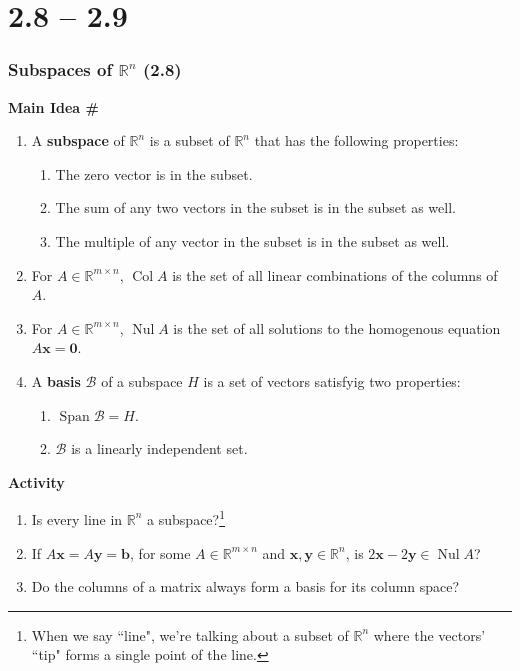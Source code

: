 \documentclass[titlepage, a4paper, 10pt]{article}
\renewcommand{\vec}[1]{\mathbf{#1}}
\DeclareMathOperator{\vspan}{Span}
\DeclareMathOperator{\colspace}{Col}
\DeclareMathOperator{\nullspace}{Nul}
\newcounter{mainideas}
\newcommand{\mainidea}{\textbf{Main Idea \#\themainideas \stepcounter{mainideas}}}
\newenvironment{mideea}[1]
{%
\begin{lrbox}{\mybox}%
	\begin{minipage}{#1\textwidth}
		{\centering \mainidea \par}

}
{\end{minipage}\end{lrbox}\begin{center}\fbox{\usebox{\mybox}}\end{center}}
\newcounter{activity}
\newenvironment{newactivity}
{
	\noindent\textbf{Activity \theactivity}
}
{
\stepcounter{activity}
\par
}
\begin{document}
\part{2.8 -- 2.9}
\section{\centering Subspaces of \(\mathbb{R}^n\) (2.8)}
\begin{mideea}{0.9}
	\begin{enumerate}
		\item A \textbf{subspace} of \(\mathbb{R}^n\) is a subset of \(\mathbb{R}^n\) that has the following properties:
			\begin{enumerate}
				\item The zero vector is in the subset.
				\item The sum of any two vectors in the subset is in the subset as well.
				\item The multiple of any vector in the subset is in the subset as well.
			\end{enumerate}
		\item For \(A \in \mathbb{R}^{m \times n}\), \(\colspace A\) is the set of all linear combinations of the columns of \(A\). 
		\item For \(A \in \mathbb{R}^{m \times n}\), \(\nullspace A\) is the set of all solutions to the homogenous equation \(A \vec{x} = \vec{0}\).
		\item A \textbf{basis} \(\mathcal{B}\) of a subspace \(H\) is a set of vectors satisfyig two properties:
			\begin{enumerate}
				\item \(\vspan \mathcal{B} = H\).
				\item \(\mathcal{B}\) is a linearly independent set.
			\end{enumerate}
	\end{enumerate}
\end{mideea}

\begin{newactivity}
	\begin{enumerate}
		\item Is every line in \(\mathbb{R}^n\) a subspace?\footnote{When we say ``line", we're talking about a subset of \(\mathbb{R}^n\) where the 
			vectors' ``tip" forms a single point of the line.}
		\item If \(A \vec{x} = A \vec{y} = \vec{b}\), for some \(A \in \mathbb{R}^{m \times n}\) and \(\vec{x}, \vec{y} \in \mathbb{R}^{n}\), is 
			\(2\vec{x} - 2\vec{y} \in \nullspace A\)?
		\item Do the columns of a matrix always form a basis for its column space?
	\end{enumerate}
\end{newactivity}
\end{document}
